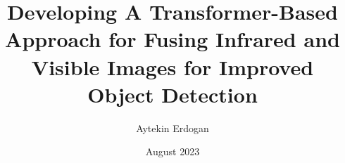 \documentclass[chaparabic,is,ms,10pt,single]{metu}
\author{Aytekin Erdogan} %
\title{Developing A Transformer-Based Approach for Fusing Infrared and Visible Images for Improved Object Detection} %
\date{August 2023} %
\begin{document}
\begin{preliminaries}


\end{preliminaries}
%   
% 
%

\setlength{\parindent}{0em}
\setlength{\parskip}{10pt}










%
%

%

% 

\appendix



%
\end{document}
